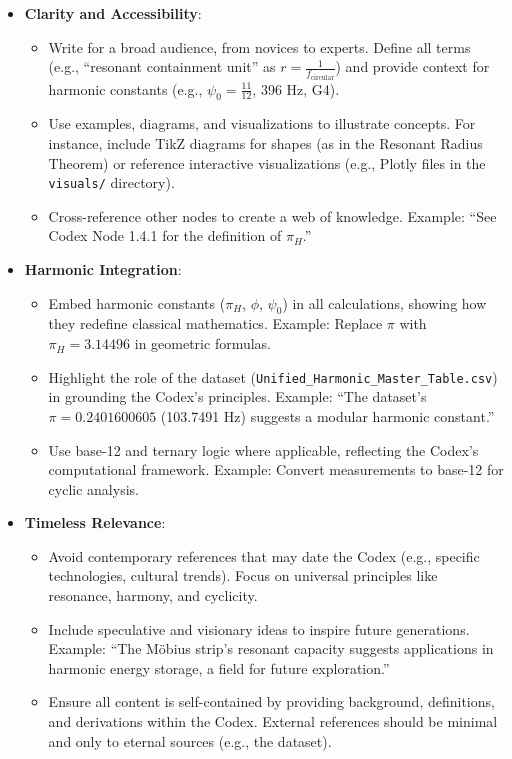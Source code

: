 \begin{itemize}
    \item \textbf{Clarity and Accessibility}: 
    \begin{itemize}
        \item Write for a broad audience, from novices to experts. Define all terms (e.g., ``resonant containment unit'' as \( r = \frac{1}{f_{\text{circular}}} \)) and provide context for harmonic constants (e.g., \(\psi_0 = \frac{11}{12}\), 396 Hz, G4).
        \item Use examples, diagrams, and visualizations to illustrate concepts. For instance, include TikZ diagrams for shapes (as in the Resonant Radius Theorem) or reference interactive visualizations (e.g., Plotly files in the \texttt{visuals/} directory).
        \item Cross-reference other nodes to create a web of knowledge. Example: ``See Codex Node 1.4.1 for the definition of \(\pi_H\).''
    \end{itemize}

    \item \textbf{Harmonic Integration}: 
    \begin{itemize}
        \item Embed harmonic constants (\(\pi_H\), \(\phi\), \(\psi_0\)) in all calculations, showing how they redefine classical mathematics. Example: Replace \(\pi\) with \(\pi_H = 3.14496\) in geometric formulas.
        \item Highlight the role of the dataset (\texttt{Unified\_Harmonic\_Master\_Table.csv}) in grounding the Codex’s principles. Example: ``The dataset’s \(\pi = 0.2401600605\) (103.7491 Hz) suggests a modular harmonic constant.''
        \item Use base-12 and ternary logic where applicable, reflecting the Codex’s computational framework. Example: Convert measurements to base-12 for cyclic analysis.
    \end{itemize}

    \item \textbf{Timeless Relevance}: 
    \begin{itemize}
        \item Avoid contemporary references that may date the Codex (e.g., specific technologies, cultural trends). Focus on universal principles like resonance, harmony, and cyclicity.
        \item Include speculative and visionary ideas to inspire future generations. Example: ``The Möbius strip’s resonant capacity suggests applications in harmonic energy storage, a field for future exploration.''
        \item Ensure all content is self-contained by providing background, definitions, and derivations within the Codex. External references should be minimal and only to eternal sources (e.g., the dataset).
    \end{itemize}


\end{itemize}
